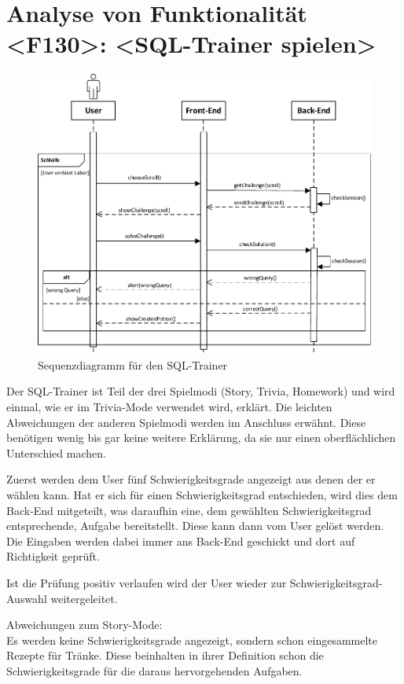 \section{Analyse von Funktionalität <F130>: <SQL-Trainer spielen>}
\begin{figure}[h]
\centering
\includegraphics[width=1.3\textwidth]{figures/sequenz_F130.pdf}
\caption{Sequenzdiagramm für den SQL-Trainer}
\label{sequence}
\end{figure}


Der SQL-Trainer ist Teil der drei Spielmodi (Story, Trivia, Homework) und wird einmal, wie er im Trivia-Mode verwendet wird, erklärt. Die leichten Abweichungen der anderen Spielmodi werden im Anschluss erwähnt. Diese benötigen wenig bis gar keine weitere Erklärung, da sie nur einen oberflächlichen Unterschied machen.

Zuerst werden dem User f\"unf Schwierigkeitsgrade angezeigt aus denen der er wählen kann. Hat er sich für einen Schwierigkeitsgrad entschieden, wird dies dem Back-End mitgeteilt, was daraufhin eine, dem gewählten Schwierigkeitsgrad entsprechende, Aufgabe bereitstellt. Diese kann dann vom User gelöst werden. Die Eingaben werden dabei immer ans Back-End geschickt und dort auf Richtigkeit geprüft. 

Ist die Prüfung positiv verlaufen wird der User wieder zur Schwierigkeitsgrad-Auswahl weitergeleitet.


Abweichungen zum Story-Mode:\\
Es werden keine Schwierigkeitsgrade angezeigt, sondern schon eingesammelte Rezepte für Tränke. Diese beinhalten in ihrer Definition schon die Schwierigkeitsgrade für die daraus hervorgehenden Aufgaben.


